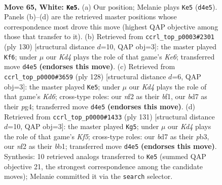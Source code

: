 \documentclass[11pt]{article}
\begin{document}
\clearpage

\begin{figure}[p]\centering
\begin{subfigure}{0.46\textwidth}\centering
\resizebox{\linewidth}{!}{%
\newchessgame
\chessboard[
  setfen={8/k2b4/8/P7/1P1K4/4N3/3p1n2/8 w - - 8 65},
  showmover=false,
  pgfstyle=straightmove, color=movearrow, markmove={d4-e5}
]}
\caption{}
\end{subfigure}\hfill
\begin{subfigure}{0.46\textwidth}\centering
\resizebox{\linewidth}{!}{%
\newchessgame
\chessboard[
  setfen={6k1/8/1n2K1P1/5N1p/8/8/8/8 w - - 0 66},
  showmover=false,
  pgfstyle=straightmove, color=movearrow, markmove={e6-f6}
]}
\caption{}
\end{subfigure}
\\[4pt]
\begin{subfigure}{0.46\textwidth}\centering
\resizebox{\linewidth}{!}{%
\newchessgame
\chessboard[
  setfen={8/4N1p1/3K4/8/6p1/4k1P1/7P/5b2 w - - 5 65},
  showmover=false,
  pgfstyle=straightmove, color=movearrow, markmove={d6-e5}
]}
\caption{}
\end{subfigure}\hfill
\begin{subfigure}{0.46\textwidth}\centering
\resizebox{\linewidth}{!}{%
\newchessgame
\chessboard[
  setfen={8/p7/Pp6/4n2P/5k2/1P6/3K4/1B6 b - - 0 66},
  showmover=false,
  pgfstyle=straightmove, color=movearrow, markmove={f4-g5}
]}
\caption{}
\end{subfigure}
\caption{\textbf{Move 65, White: \texttt{Ke5}.} (a) Our position; Melanie plays \texttt{Ke5} (\texttt{d4e5}). Panels (b)--(d) are the retrieved master positions whose correspondence most drove this move (highest QAP objective among those that transfer to it). (b) Retrieved from \texttt{ccrl\_top\_p0003\#2301} (ply 130) [structural distance $d$=10, QAP obj=3]: the master played \texttt{Kf6}; under $\mu$ our \emph{Kd4} plays the role of that game's \emph{Ke6}; transferred move \texttt{d4e5} \textbf{(endorses this move)}. (c) Retrieved from \texttt{ccrl\_top\_p0000\#3659} (ply 128) [structural distance $d$=6, QAP obj=3]: the master played \texttt{Ke5}; under $\mu$ our \emph{Kd4} plays the role of that game's \emph{Kd6}; cross-type roles: our \emph{n}f2 as their \emph{b}f1, our \emph{b}d7 as their \emph{p}g4; transferred move \texttt{d4e5} \textbf{(endorses this move)}. (d) Retrieved from \texttt{ccrl\_top\_p0000\#1433} (ply 131) [structural distance $d$=10, QAP obj=3]: the master played \texttt{Kg5}; under $\mu$ our \emph{Kd4} plays the role of that game's \emph{Kf5}; cross-type roles: our \emph{b}d7 as their \emph{p}b3, our \emph{n}f2 as their \emph{b}b1; transferred move \texttt{d4e5} \textbf{(endorses this move)}. Synthesis: 10 retrieved analogs transferred to \texttt{Ke5} (summed QAP objective 21, the strongest correspondence among the candidate moves); Melanie committed it via the \texttt{search} selector.}
\label{fig:thought-m128}
\end{figure}
\end{document}
